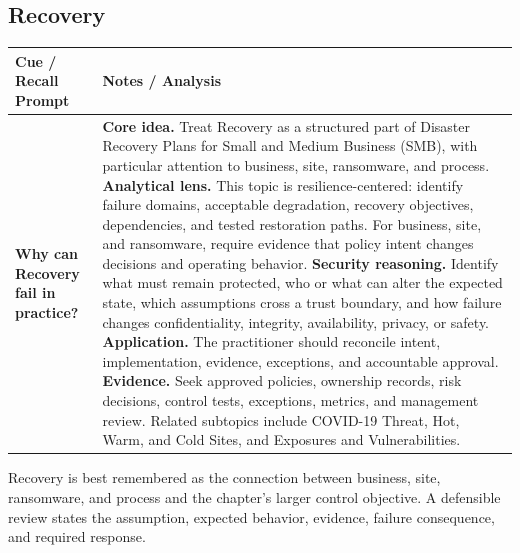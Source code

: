 \documentclass[11pt]{article}
\newcommand{\CornellHeader}{%
\rowcolor{Navy}\color{white}\bfseries Cue / Recall Prompt & \color{white}\bfseries Notes / Analysis\\\hline}
\newcommand{\CornellRow}[2]{%
\cellcolor{CueGray}\RaggedRight\textbf{#1} & \RaggedRight #2\\\hline}
\begin{document}
\subsection*{Recovery}
\begin{longtable}{>{\RaggedRight\arraybackslash}p{}|>{\RaggedRight\arraybackslash}p{}}
\CornellHeader
\CornellRow{Why can Recovery fail in practice?}{\textbf{Core idea.} Treat Recovery as a structured part of Disaster Recovery Plans for Small and Medium Business (SMB), with particular attention to business, site, ransomware, and process. \textbf{Analytical lens.} This topic is resilience-centered: identify failure domains, acceptable degradation, recovery objectives, dependencies, and tested restoration paths. For business, site, and ransomware, require evidence that policy intent changes decisions and operating behavior. \textbf{Security reasoning.} Identify what must remain protected, who or what can alter the expected state, which assumptions cross a trust boundary, and how failure changes confidentiality, integrity, availability, privacy, or safety. \textbf{Application.} The practitioner should reconcile intent, implementation, evidence, exceptions, and accountable approval. \textbf{Evidence.} Seek approved policies, ownership records, risk decisions, control tests, exceptions, metrics, and management review. Related subtopics include COVID-19 Threat, Hot, Warm, and Cold Sites, and Exposures and Vulnerabilities.}
\end{longtable}
\begin{topicsummary}
Recovery is best remembered as the connection between business, site, ransomware, and process and the chapter's larger control objective. A defensible review states the assumption, expected behavior, evidence, failure consequence, and required response.
\end{topicsummary}
\end{document}
